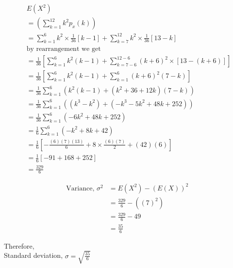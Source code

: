 \documentclass[journal,12pt,twocolumn]{IEEEtran}
\begin{document}
\begin{group}

\allowdisplaybreaks
\begin{align}
    & E(X^2)\\
    &= \left(\sum_{k=1}^{12}k^2p_x(k)\right)\\
    &= \sum_{k=1}^{6}k^2\times\frac{1}{36}[k-1] + \sum_{k=7}^{12}k^2\times\frac{1}{36}[13-k]\\
    &\text{by rearrangement we get}\\
    &= \frac{1}{36}\left[\sum_{k=1}^{6}k^2(k-1) + \sum_{k=7-6}^{12-6}(k+6)^2\times[13-(k+6)]\right]\\
    &= \frac{1}{36}\left[\sum_{k=1}^{6}k^2(k-1) + \sum_{k=1}^{6}(k+6)^2(7-k)\right]\\
    &= \frac{1}{36}\sum_{k=1}^{6}\left(k^2(k-1) + (k^2+36+12k)(7-k)\right)\\
    &= \frac{1}{36}\sum_{k=1}^{6}\left((k^3-k^2) + (-k^3-5k^2+48k+252)\right)\\
    &= \frac{1}{36}\sum_{k=1}^{6}(-6k^2+48k+252)\\
    &= \frac{1}{6}\sum_{k=1}^{6}(-k^2+8k+42)\\
    &= \frac{1}{6}\left[ -\frac{(6)(7)(13)}{6} + 8\times\frac{(6)(7)}{2}+ (42)(6) \right]\\
    &= \displaystyle\frac{1}{6}[-91+168+252]\\
    &= \displaystyle\frac{329}{6}
\end{align}
\end{group}
\begin{align}
    \text{ Variance, }\sigma^2 &= E(X^2)-(E(X))^2\\
    &= \displaystyle\frac{329}{6}- ((7)^2)\\
    &= \displaystyle\frac{329}{6} - 49\\
    &= \displaystyle\frac{35}{6}
\end{align}

Therefore,\\
Standard deviation, $\sigma=\sqrt{\displaystyle\frac{35}{6}}$
\end{document}
